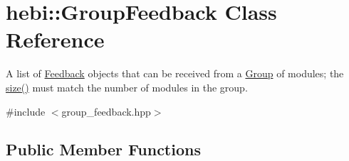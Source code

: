 \hypertarget{classhebi_1_1GroupFeedback}{}\section{hebi\+:\+:Group\+Feedback Class Reference}
\label{classhebi_1_1GroupFeedback}


A list of \hyperlink{classhebi_1_1Feedback}{Feedback} objects that can be received from a \hyperlink{classhebi_1_1Group}{Group} of modules; the \hyperlink{classhebi_1_1GroupFeedback_a7509084e361feaf90d857d77afa4e4c0}{size()} must match the number of modules in the group.  




{\ttfamily \#include $<$group\+\_\+feedback.\+hpp$>$}

\subsection*{Public Member Functions}
